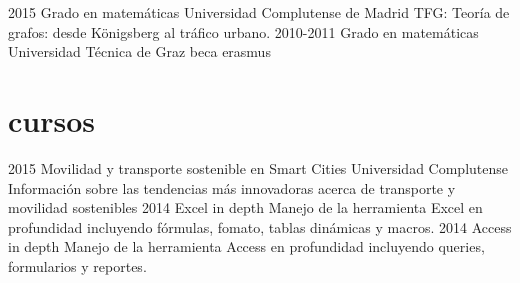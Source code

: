 \documentclass[]{friggeri-cv}
\begin{document}
\begin{entrylist}
  \entry
    {2015}
    {Grado en matemáticas}
    {Universidad Complutense de Madrid}
    {TFG: Teoría de grafos: desde Königsberg al tráfico urbano.}
  \entry
    {2010-2011}
    {Grado en matemáticas}
    {Universidad Técnica de Graz}
    {beca erasmus}
\end{entrylist}

\section{cursos}

\begin{entrylist}
  \entry
    {2015}
    {Movilidad y transporte sostenible en Smart Cities}
    {Universidad Complutense}
    {Información sobre las tendencias más innovadoras acerca de transporte y movilidad sostenibles}
  \entry
    {2014}
    {Excel in depth}
    {}
    {Manejo de la herramienta Excel en profundidad incluyendo fórmulas, fomato, tablas dinámicas y macros.}
  \entry
    {2014}
    {Access in depth}
    {}
    {Manejo de la herramienta Access en profundidad incluyendo queries, formularios y reportes.}
\end{entrylist}





\fi
\end{document}
